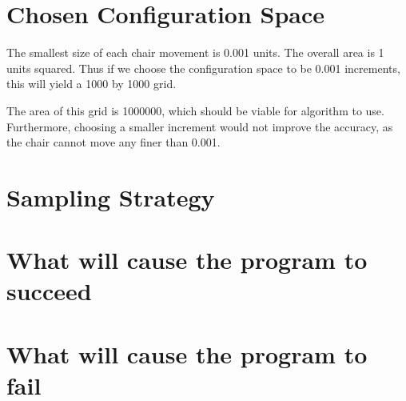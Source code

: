 \documentclass[12pt]{article}
\begin{document}
    \maketitle

    \section{Chosen Configuration Space}

    The smallest size of each chair movement is 0.001 units. The overall area is 1 units squared. Thus if we choose the configuration space to be 0.001 increments, this will yield a 1000 by 1000 grid. 
    
    The area of this grid is 1000000, which should be viable for algorithm to use. Furthermore, choosing a smaller increment would not improve the accuracy, as the chair cannot move any finer than 0.001.



    \section{Sampling Strategy}

    \section{What will cause the program to succeed}

    \section{What will cause the program to fail}
\end{document}
